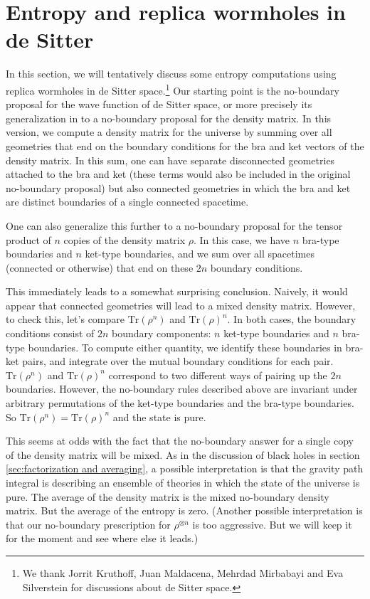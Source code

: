 \documentclass[11pt]{article}
\numberwithin{equation}{section}
\def\tr{\text{Tr}}
\begin{document}
\section{Entropy and replica wormholes in de Sitter}\label{sec:desitter}
In this section, we will tentatively discuss some entropy computations using replica wormholes in de Sitter space.\footnote{We thank Jorrit Kruthoff, Juan Maldacena, Mehrdad Mirbabayi and Eva Silverstein for discussions about de Sitter space.} Our starting point is the no-boundary proposal \cite{PhysRevD.28.2960} for the wave function of de Sitter space, or more precisely its generalization in \cite{PhysRevD.34.2267,barvinsky2008density,Maldacena:2019cbz,maldacenaStrings2019} to a no-boundary proposal for the density matrix. In this version, we compute a density matrix for the universe by summing over all geometries that end on the boundary conditions for the bra and ket vectors of the density matrix. In this sum, one can have separate disconnected geometries attached to the bra and ket (these terms would also be included in the original no-boundary proposal) but also connected geometries in which the bra and ket are distinct boundaries of a single connected spacetime. 

One can also generalize this further to a no-boundary proposal for the tensor product of $n$  copies of the density matrix $\rho$. In this case, we have $n$ bra-type boundaries and $n$ ket-type boundaries, and we sum over all spacetimes (connected or otherwise) that end on these $2n$ boundary conditions. 

This immediately leads to a somewhat surprising conclusion. Naively, it would appear that connected geometries will lead to a mixed density matrix. However, to check this, let's compare $\tr(\rho^n)$ and $\tr(\rho)^n$. In both cases, the boundary conditions consist of $2n$ boundary components: $n$ ket-type boundaries and $n$ bra-type boundaries. To compute either quantity, we identify these boundaries in bra-ket pairs, and integrate over the mutual boundary conditions for each pair. $\tr(\rho^n)$ and $\tr(\rho)^n$ correspond to two different ways of pairing up the $2n$ boundaries. However, the no-boundary rules described above are invariant under arbitrary permutations of the ket-type boundaries and the bra-type boundaries. So $\tr(\rho^n) = \tr(\rho)^n$ and the state is pure.

This seems at odds with the fact that the no-boundary answer for a single copy of the density matrix will be mixed. As in the discussion of black holes in section \ref{sec:factorization and averaging}, a possible interpretation is that the gravity path integral is describing an ensemble of theories in which the state of the universe is pure. The average of the density matrix is the mixed no-boundary density matrix. But the average of the entropy is zero. (Another possible interpretation is that our no-boundary prescription for $\rho^{\otimes n}$ is too aggressive. But we will keep it for the moment and see where else it leads.)
\end{document}
